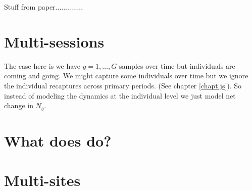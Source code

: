 Stuff from paper..............

\section{Multi-sessions}

The case here is we have $g=1,\ldots,G$ samples over time but
individuals are coming and going.
We might capture some individuals over time but we ignore the
individual recaptures across primary periods. (See chapter
\ref{chapt.js}). So instead of modeling the dynamics at the individual
level we just model net change in $N_{g}$.


\section{What does \secr do?}




\section{Multi-sites}

